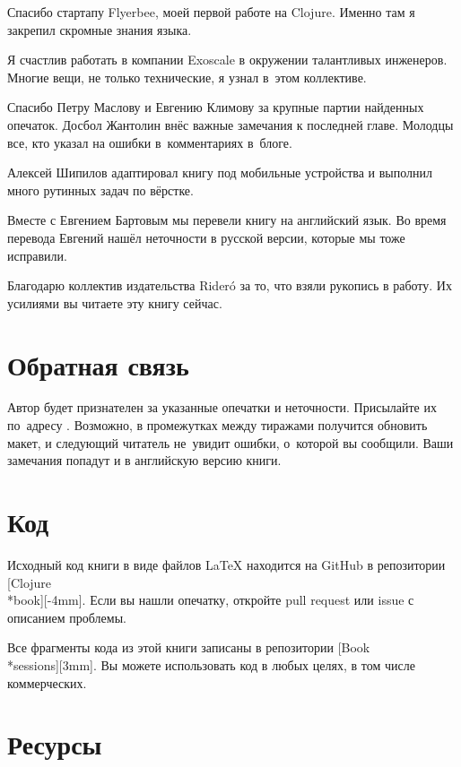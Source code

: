 Спасибо стартапу Flyerbee, моей первой работе на Clojure. Именно там я закрепил
скромные знания языка.

Я счастлив работать в компании Exoscale в окружении талантливых
инженеров. Многие вещи, не только технические, я узнал в~этом коллективе.

Спасибо Петру Маслову и Евгению Климову за крупные партии найденных
опечаток. Досбол Жантолин внёс важные замечания к последней главе. Молодцы все,
кто указал на ошибки в~комментариях в~блоге.

Алексей Шипилов адаптировал книгу под мобильные устройства и выполнил много
рутинных задач по вёрстке.

Вместе с Евгением Бартовым мы перевели книгу на английский язык. Во время
перевода Евгений нашёл неточности в русской версии, которые мы тоже исправили.

\ifridero
Благодарю коллектив издательства Rider\'{o} за то, что взяли рукопись в
работу. Их усилиями вы читаете эту книгу сейчас.
\fi

\section*{Обратная связь}

Автор будет признателен за указанные опечатки и неточности. Присылайте их
по~адресу \EMAILLINK. Возможно, в промежутках между тиражами получится обновить
макет, и следующий читатель не~увидит ошибки, о~которой вы сообщили. Ваши
замечания попадут и в английскую версию книги.

\section*{Код}

Исходный код книги в виде файлов \LaTeX{} находится на GitHub в репозитории
[Clojure\\*book][-4mm]. Если
вы нашли опечатку, откройте pull request или issue с описанием проблемы.

Все фрагменты кода из этой книги записаны в репозитории
[Book\\*sessions][3mm]. Вы
можете использовать код в любых целях, в том числе коммерческих.

\section*{Ресурсы}

